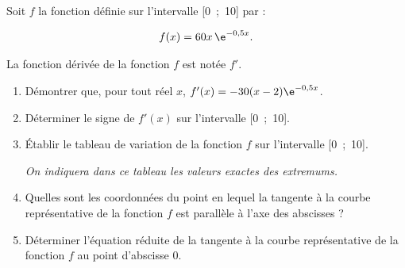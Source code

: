 \medskip

Soit $f$ la fonction définie sur l'intervalle [0~;~10] par : 

\[f(x)= 60x\,\e^{- 0,5x}.\]

La fonction dérivée de la fonction $f$ est notée $f'$.

\medskip

\begin{enumerate}
\item Démontrer que, pour tout réel $x$, $f'(x) = - 30(x - 2)\e^{-0,5x}$.
\item Déterminer le signe de $f'(x)$ sur l'intervalle [0~;~10].
\item Établir le tableau de variation de la fonction $f$ sur l'intervalle [0~;~10].

\emph{On indiquera dans ce tableau les valeurs exactes des extremums.}
\item Quelles sont les coordonnées du point en lequel la tangente à la courbe représentative de
la fonction $f$ est parallèle à l'axe des abscisses ?
\item Déterminer l'équation réduite de la tangente à la courbe représentative de la fonction $f$
au point d'abscisse 0.
\end{enumerate}

\vspace{0,5cm}

